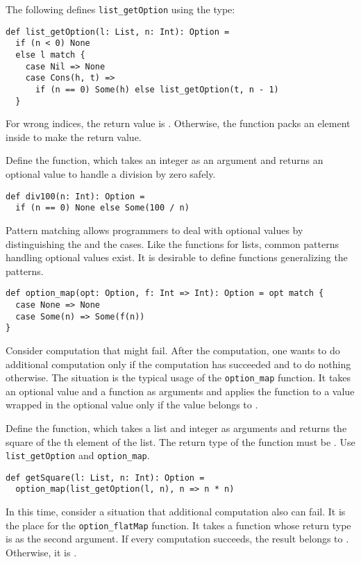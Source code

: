 The following defines \verb!list_getOption! using the  type:

\begin{verbatim}
def list_getOption(l: List, n: Int): Option =
  if (n < 0) None
  else l match {
    case Nil => None
    case Cons(h, t) =>
      if (n == 0) Some(h) else list_getOption(t, n - 1)
  }
\end{verbatim}

For wrong indices, the return value is . Otherwise, the function packs
an element inside  to make the return value.

Define the  function, which takes an integer as an argument and
returns an optional value to handle a division by zero safely.

\begin{verbatim}
def div100(n: Int): Option =
  if (n == 0) None else Some(100 / n)
\end{verbatim}

Pattern matching allows programmers to deal with optional values by
distinguishing the  and the  cases. Like the functions for
lists, common patterns handling optional values exist. It is desirable to define
functions generalizing the patterns.

\begin{verbatim}
def option_map(opt: Option, f: Int => Int): Option = opt match {
  case None => None
  case Some(n) => Some(f(n))
}
\end{verbatim}

Consider computation that might fail. After the computation, one wants to do
additional computation only if the computation has succeeded and to do nothing
otherwise. The situation is the typical usage of the \verb!option_map! function.
It takes an optional value and a function as arguments and applies the function
to a value wrapped in the optional value only if the value belongs to
.

Define the  function, which takes a list and integer  as
arguments and returns the square of the th element of the list. The
return type of the function must be . Use \verb!list_getOption! and
\verb!option_map!.

\begin{verbatim}
def getSquare(l: List, n: Int): Option =
  option_map(list_getOption(l, n), n => n * n)
\end{verbatim}

In this time, consider a situation that additional computation also can fail. It
is the place for the \verb!option_flatMap! function. It takes a function whose
return type is  as the second argument. If every computation
succeeds, the result belongs to . Otherwise, it is .


